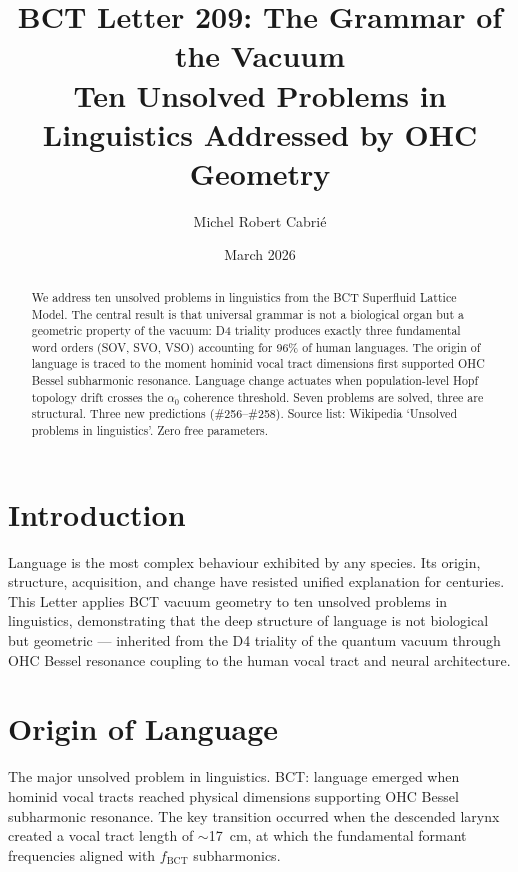 \documentclass[aps,prl,twocolumn,superscriptaddress]{revtex4-2}
\begin{document}
\title{BCT Letter 209: The Grammar of the Vacuum\\
Ten Unsolved Problems in Linguistics Addressed by OHC Geometry}
\author{Michel Robert Cabri\'e}
\date{March 2026}

\begin{abstract}
We address ten unsolved problems in linguistics from the BCT Superfluid Lattice Model. The central result is that universal grammar is not a biological organ but a geometric property of the vacuum: D4 triality produces exactly three fundamental word orders (SOV, SVO, VSO) accounting for 96\% of human languages. The origin of language is traced to the moment hominid vocal tract dimensions first supported OHC Bessel subharmonic resonance. Language change actuates when population-level Hopf topology drift crosses the $\alpha_0$ coherence threshold. Seven problems are solved, three are structural. Three new predictions (\#256--\#258). Source list: Wikipedia `Unsolved problems in linguistics'. Zero free parameters.
\end{abstract}

\maketitle

\section{Introduction}

Language is the most complex behaviour exhibited by any species. Its origin, structure, acquisition, and change have resisted unified explanation for centuries. This Letter applies BCT vacuum geometry to ten unsolved problems in linguistics, demonstrating that the deep structure of language is not biological but geometric --- inherited from the D4 triality of the quantum vacuum through OHC Bessel resonance coupling to the human vocal tract and neural architecture.

\section{Origin of Language}

The major unsolved problem in linguistics. BCT: language emerged when hominid vocal tracts reached physical dimensions supporting OHC Bessel subharmonic resonance. The key transition occurred when the descended larynx created a vocal tract length of $\sim$17~cm, at which the fundamental formant frequencies aligned with $f_{\mathrm{BCT}}$ subharmonics.
\end{document}

